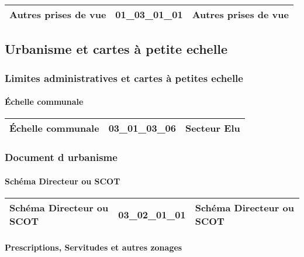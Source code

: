 \documentclass[12pt,titlepage,oneside]{book}
\begin{document}
\renewcommand{\arraystretch}{1.2}
\begin{supertabular}{|p{10cm}|c|p{15cm}|}
 Autres prises de vue & 01\_03\_01\_01 & Autres prises de vue\\
\hline
\end{supertabular}
\subsection{Urbanisme et cartes à petite echelle}
\subsubsection{\large Limites administratives et cartes à petites echelle}
\paragraph{Échelle communale}
\noindent
\vspace{\baselineskip}

\renewcommand{\arraystretch}{1.2}
\begin{supertabular}{|p{10cm}|c|p{15cm}|}
 Échelle communale & 03\_01\_03\_06 & Secteur Elu\\
\hline
\end{supertabular}

\subsubsection{\large Document d urbanisme}
\paragraph{Schéma Directeur ou SCOT}
\noindent
\vspace{\baselineskip}

\renewcommand{\arraystretch}{1.2}
\begin{supertabular}{|p{10cm}|c|p{15cm}|}
 Schéma Directeur ou SCOT & 03\_02\_01\_01 & Schéma Directeur ou SCOT\\
\hline
\end{supertabular}


\paragraph{Prescriptions, Servitudes et autres zonages}
\noindent
\vspace{\baselineskip}
\end{document}
